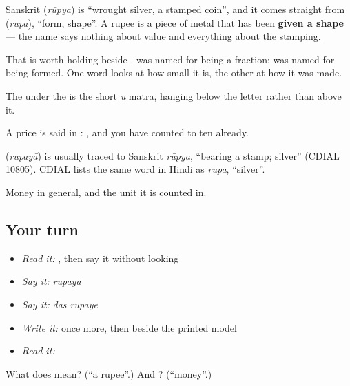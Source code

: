 Sanskrit  (\emph{rūpya}) is \textquotedblleft{}wrought silver, a stamped coin\textquotedblright{}, and it comes straight from \textbf{} (\emph{rūpa}), \textquotedblleft{}form, shape\textquotedblright{}. A rupee is a piece of metal that has been \textbf{given a shape} — the name says nothing about value and everything about the stamping.

That is worth holding beside .  was named for being a fraction;  was named for being formed. One word looks at how small it is, the other at how it was made.

The  under the  is the short \emph{u} matra, hanging below the letter rather than above it.

A price is said in : \textbf{ }, and you have counted to ten already.

\begin{cousinweb}
\textbf{} (\emph{rupayā}) is usually traced to Sanskrit \emph{rūpya}, \textquotedblleft{}bearing a stamp; silver\textquotedblright{} (CDIAL 10805). CDIAL lists the same word in Hindi as \emph{rūpā}, \textquotedblleft{}silver\textquotedblright{}.
\end{cousinweb}

\begin{grammarlens}[title={What you've built}]
Money in general, and the unit it is counted in.
\end{grammarlens}

\subsection*{Your turn}
\begin{itemize}
\raggedright
  \item \emph{Read it:} \textbf{}, then say it without looking
  \item \emph{Say it:} \emph{rupayā}
  \item \emph{Say it:} \emph{das rupaye}
  \item \emph{Write it:}  once more, then  beside the printed model
  \item \emph{Read it:} \textbf{}
\end{itemize}

\begin{tcolorbox}[breakable,colback=teal!4,colframe=teal!35!black,title={Before you move on}]
What does  mean? (\textquotedblleft{}a rupee\textquotedblright{}.) And ? (\textquotedblleft{}money\textquotedblright{}.)
\end{tcolorbox}
